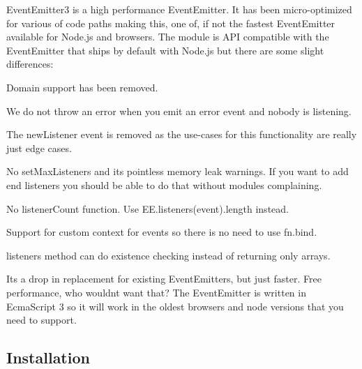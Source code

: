 \href{http://browsenpm.org/package/eventemitter3}{\tt }\href{https://travis-ci.org/primus/eventemitter3}{\tt }\href{https://david-dm.org/primus/eventemitter3}{\tt }\href{https://coveralls.io/r/primus/eventemitter3?branch=master}{\tt }\href{https://webchat.freenode.net/?channels=primus}{\tt }

\href{https://saucelabs.com/u/eventemitter3}{\tt }

Event\+Emitter3 is a high performance Event\+Emitter. It has been micro-\/optimized for various of code paths making this, one of, if not the fastest Event\+Emitter available for Node.\+js and browsers. The module is A\+PI compatible with the Event\+Emitter that ships by default with Node.\+js but there are some slight differences\+:


\begin{DoxyItemize}
\item Domain support has been removed.
\item We do not {\ttfamily throw} an error when you emit an {\ttfamily error} event and nobody is listening.
\item The {\ttfamily new\+Listener} event is removed as the use-\/cases for this functionality are really just edge cases.
\item No {\ttfamily set\+Max\+Listeners} and it\textquotesingle{}s pointless memory leak warnings. If you want to add {\ttfamily end} listeners you should be able to do that without modules complaining.
\item No {\ttfamily listener\+Count} function. Use {\ttfamily E\+E.\+listeners(event).length} instead.
\item Support for custom context for events so there is no need to use {\ttfamily fn.\+bind}.
\item {\ttfamily listeners} method can do existence checking instead of returning only arrays.
\end{DoxyItemize}

It\textquotesingle{}s a drop in replacement for existing Event\+Emitters, but just faster. Free performance, who wouldn\textquotesingle{}t want that? The Event\+Emitter is written in Ecma\+Script 3 so it will work in the oldest browsers and node versions that you need to support.

\subsection*{Installation}




